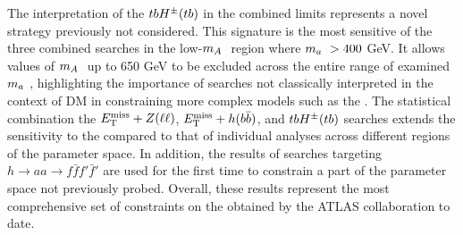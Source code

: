 The interpretation of the $tbH^{\pm}(tb)$ in the combined limits represents a novel strategy previously not considered. This signature is the most sensitive of the three combined searches in the low-$m_A~$ region where $m_a~>400$ GeV. It allows values of $m_A~$ up to 650 GeV to be excluded across the entire range of examined $m_a~$, highlighting the importance of searches not classically interpreted in the context of DM in constraining more complex models such as the \hdma. The statistical combination the $E_{\mathrm{T}}^{\mathrm{miss}}+Z(\ell\ell)$, $E_{\mathrm{T}}^{\mathrm{miss}}+h(b\bar{b})$, and $tbH^{\pm}(tb)$ searches extends the sensitivity to the \thdma compared to that of individual analyses across different regions of the parameter space. In addition, the results of searches targeting $h\rightarrow aa \rightarrow f\bar{f} f'\bar{f}'$ are used for the first time to constrain a part of the parameter space not previously probed. Overall, these results represent the most comprehensive set of constraints on the \thdma obtained by the ATLAS collaboration to date.


